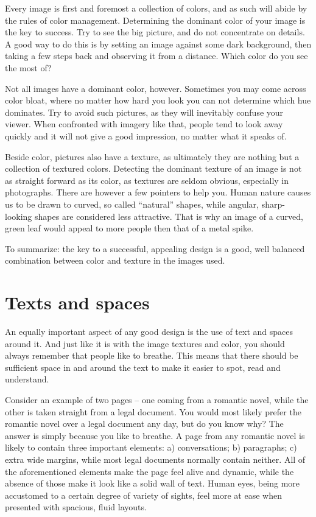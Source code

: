 Every image is first and foremost a collection of colors, and as such will abide
by the rules of color management. Determining the dominant color of your image is
the key to success. Try to see the big picture, and do not concentrate on
details. A good way to do this is by setting an image against some dark
background, then taking a few steps back and observing it from a distance. Which
color do you see the most of?

Not all images have a dominant color, however. Sometimes you may come across
color bloat, where no matter how hard you look you can not determine which hue
dominates. Try to avoid such pictures, as they will inevitably confuse your
viewer. When confronted with imagery like that, people tend to look away quickly
and it will not give a good impression, no matter what it speaks of.

Beside color, pictures also have a texture, as ultimately they are nothing but a
collection of textured colors. Detecting the dominant texture of an image is not as
straight forward as its color, as textures are seldom obvious, especially in
photographs. There are however a few pointers to help you. Human nature causes
us to be drawn to curved, so called ``natural'' shapes, while angular,
sharp-looking shapes are considered less attractive. That is why an image of a
curved, green leaf would appeal to more people then that of a metal spike.

To summarize: the key to a successful, appealing design is a good, well
balanced combination between color and texture in the images used.

\section*{Texts and spaces}

An equally important aspect of any good design is the use of text and
spaces around it. And just like it is with the image textures and color, you
should always remember that people like to breathe. This means that there should be
sufficient space in and around the text to make it easier to spot, read and
understand.

Consider an example of two pages -- one coming from a romantic novel, while the
other is taken straight from a legal document. You would most likely prefer the
romantic novel over a legal document any day, but do you know why? The answer is
simply because you like to breathe. A page from any romantic novel is likely to
contain three important elements: a) conversations; b) paragraphs; c) extra wide
margins, while most legal documents normally contain neither. All of the
aforementioned elements make the page feel alive and dynamic, while the absence
of those make it look like a solid wall of text. Human eyes, being more
accustomed to a certain degree of variety of sights, feel more at ease when
presented with spacious, fluid layouts.

